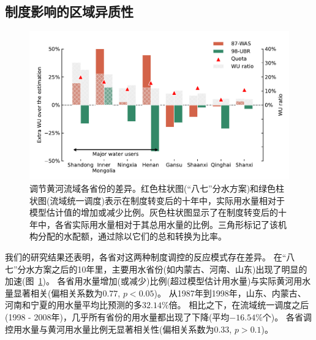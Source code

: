 \subsection{制度影响的区域异质性}
\label{result-3}

\begin{figure}[!htb]
	\includegraphics[width=\textwidth]{img/ch5/fig3.pdf}
	\caption[调节黄河流域各省份的差异]{调节黄河流域各省份的差异。红色柱状图(“八七”分水方案)和绿色柱状图(流域统一调度)表示在制度转变后的十年中，实际用水量相对于模型估计值的增加或减少比例。灰色柱状图显示了在制度转变后的十年中，各省实际用水量相对于其总用水量的比例。三角形标记了该机构分配的水配额，通过除以它们的总和转换为比率。}\label{fig:regulating}
\end{figure}

我们的研究结果还表明，各省对这两种制度调控的反应模式存在差异。
在“八七”分水方案之后的10年里，主要用水省份(如内蒙古、河南、山东)出现了明显的加速(图~\ref{fig:regulating})。
各省用水量增加(或减少)比例(超过模型估计用水量)与实际黄河用水量显著相关(偏相关系数为$0.77$, $p<0.05$)。
从1987年到1998年，山东、内蒙古、河南和宁夏的用水量平均比预测的多$32.14\%$倍。
相比之下，在流域统一调度之后(1998 - 2008年)，几乎所有省份的用水量都出现了下降(平均$-16.54\%$个)。
各省调控用水量与黄河用水量比例无显著相关性(偏相关系数为$0.33$, $p>0.1$)。
